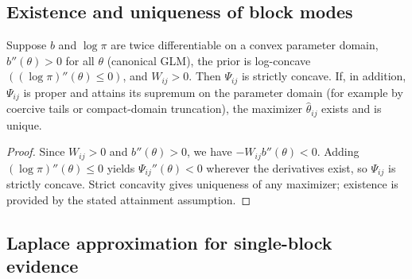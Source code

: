 \subsection{Existence and uniqueness of block modes}

\begin{lemma}
\label{lem:concave-unique}
Suppose $b$ and $\log\pi$ are twice differentiable on a convex parameter domain,
$b''(\theta)>0$ for all $\theta$ (canonical GLM), the prior is log-concave
$((\log\pi)''(\theta)\le 0)$, and $W_{ij}>0$. Then $\Psi_{ij}$ is strictly concave. If, in
addition, $\Psi_{ij}$ is proper and attains its supremum on the parameter domain (for example by
coercive tails or compact-domain truncation), the maximizer $\hat\theta_{ij}$ exists and is unique.
\end{lemma}

\begin{proof}
Since $W_{ij}>0$ and $b''(\theta)>0$, we have $-W_{ij}b''(\theta)<0$. Adding
$(\log\pi)''(\theta)\le 0$ yields $\Psi_{ij}''(\theta)<0$ wherever the derivatives exist, so
$\Psi_{ij}$ is strictly concave. Strict concavity gives uniqueness of any maximizer; existence is
provided by the stated attainment assumption.
\end{proof}

\subsection{Laplace approximation for single-block evidence}


